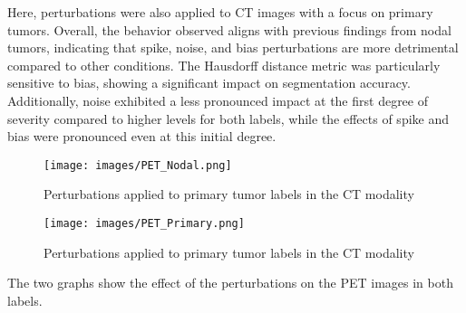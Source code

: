 Here, perturbations were also applied to CT images with a focus on primary tumors. Overall, 
the behavior observed aligns with previous findings from nodal tumors, indicating that spike, noise, and bias perturbations 
are more detrimental compared to other conditions. The Hausdorff distance metric was particularly sensitive 
to bias, showing a significant impact on segmentation accuracy. Additionally, noise exhibited a less pronounced impact 
at the first degree of severity compared to higher levels for both labels, while the effects of spike and bias were pronounced 
even at this initial degree.
\begin{figure}[ht]
    \centering
    \texttt{[image: images/PET\_Nodal.png]}
    \caption{Perturbations applied to primary tumor labels in the CT modality}
    \label{fig:three_subfigures}
\end{figure}
\newpage
\begin{figure}[ht]
    \centering
    \texttt{[image: images/PET\_Primary.png]}
    \caption{Perturbations applied to primary tumor labels in the CT modality}
    \label{fig:three_subfigures}
\end{figure}
The two graphs show the effect of the perturbations on the PET images in both labels.

